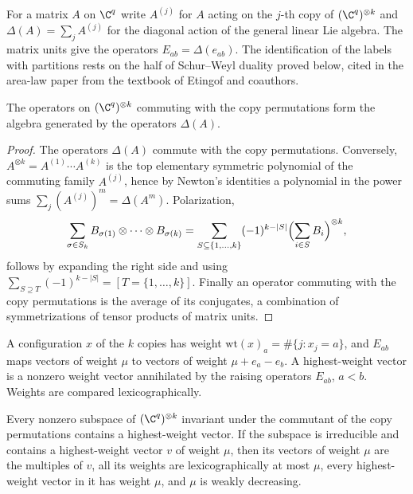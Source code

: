 For a matrix $A$ on $\C^q$ write $A^{(j)}$ for $A$ acting on the $j$-th copy of
$(\C^q)^{\otimes k}$ and $\Delta(A)=\sum_jA^{(j)}$ for the diagonal action of the
general linear Lie algebra. The matrix units give the operators
$E_{ab}=\Delta(e_{ab})$. The identification of the labels with partitions rests
on the half of Schur--Weyl duality proved below, cited in the area-law paper
from the textbook of Etingof and coauthors.

\begin{theorem}
    \label{thm:schur_weyl_commutant}
    \leanok
    The operators on $(\C^q)^{\otimes k}$ commuting with the copy permutations
    form the algebra generated by the operators $\Delta(A)$.
\end{theorem}

\begin{proof}\leanok
    The operators $\Delta(A)$ commute with the copy permutations. Conversely,
    $A^{\otimes k}=A^{(1)}\cdots A^{(k)}$ is the top elementary symmetric
    polynomial of the commuting family $A^{(j)}$, hence by Newton's identities a
    polynomial in the power sums $\sum_j(A^{(j)})^m=\Delta(A^m)$. Polarization,
    \[
        \sum_{\sigma\in S_k}B_{\sigma(1)}\otimes\cdots\otimes B_{\sigma(k)}
        =\sum_{S\subseteq\{1,\dots,k\}}(-1)^{k-|S|}
            \Bigl(\sum_{i\in S}B_i\Bigr)^{\otimes k},
    \]
    follows by expanding the right side and using
    $\sum_{S\supseteq T}(-1)^{k-|S|}=[T=\{1,\dots,k\}]$. Finally an operator
    commuting with the copy permutations is the average of its conjugates,
    a combination of symmetrizations of tensor products of matrix units.
\end{proof}

A configuration $x$ of the $k$ copies has weight
$\mathrm{wt}(x)_a=\#\{j:x_j=a\}$, and $E_{ab}$ maps vectors of weight $\mu$ to
vectors of weight $\mu+e_a-e_b$. A highest-weight vector is a nonzero weight
vector annihilated by the raising operators $E_{ab}$, $a<b$. Weights are
compared lexicographically.

\begin{theorem}
    \label{thm:highest_weight}
    \leanok
    Every nonzero subspace of $(\C^q)^{\otimes k}$ invariant under the commutant
    of the copy permutations contains a highest-weight vector. If the subspace
    is irreducible and contains a highest-weight vector $v$ of weight $\mu$,
    then its vectors of weight $\mu$ are the multiples of $v$, all its weights
    are lexicographically at most $\mu$, every highest-weight vector in it has
    weight $\mu$, and $\mu$ is weakly decreasing.
\end{theorem}

